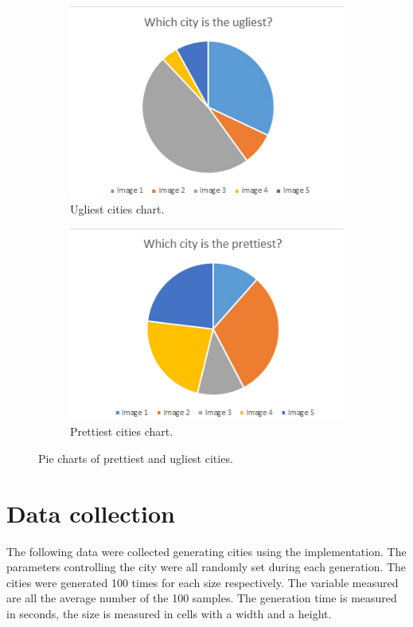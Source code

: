 	\begin{figure}[h]
		\begin{subfigure}{0.5\textwidth}
			\centering
			\includegraphics[width=0.9\linewidth]{"Images/Ugliest"}
			\caption{Ugliest cities chart.}
			\label{fig:pie-chart-ugly}
		\end{subfigure}
		\begin{subfigure}{0.5\textwidth}
			\centering
			\includegraphics[width=0.9\linewidth]{"Images/Prettiest"}
			\caption{Prettiest cities chart.}
			\label{fig:pie-chart-pretty}
		\end{subfigure}
		\caption{Pie charts of prettiest and ugliest cities.}
		\label{fig:pie-chart-ugly-pretty}
	\end{figure}


\newpage
\section{Data collection}
	The following data were collected generating cities using the implementation. The parameters controlling the city were all randomly set during each generation. The cities were generated 100 times for each size respectively. The variable measured are all the average number of the 100 samples. The generation time is measured in seconds, the size is measured in cells with a width and a height.
	
